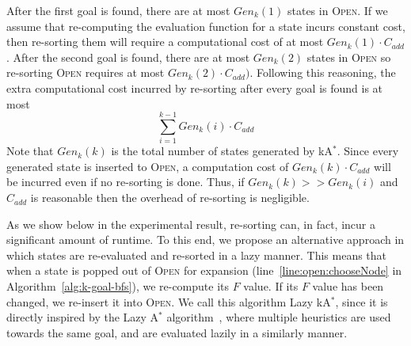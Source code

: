 \documentclass{aicom2e}
\newcommand{\astar}{A$^*$}
\newcommand{\kastar}{kA$^*$}
\newcommand{\open}{\textsc{Open}}
\begin{document}

After the first goal is found, there are at most $Gen_k(1)$ states in \open{}. If we assume that re-computing the evaluation function for a state incurs constant cost, then re-sorting them will require a computational cost of at most $Gen_k(1)\cdot C_{add}$. After the second goal is found, there are at most $Gen_k(2)$ states in \open{} so re-sorting \open{} requires at most $Gen_k(2)\cdot C_{add})$. Following this reasoning, the extra computational cost incurred by re-sorting after every goal is found is at most  
\begin{equation}  
\sum_{i=1}^{k-1} Gen_k(i)\cdot C_{add}
\label{eq:re-sort-cost}
\end{equation}
Note that $Gen_k(k)$ is the total number of states generated by \kastar{}. 
Since every generated state is inserted to \open{}, a computation cost of $Gen_k(k)\cdot C_{add}$ will be incurred even if no re-sorting is done. 
Thus, if $Gen_k(k)>>Gen_k(i)$ and $C_{add}$ is reasonable then the overhead of re-sorting is negligible. 


As we show below in the experimental result, re-sorting can, in fact, incur a significant amount of runtime. To this end, we propose an alternative approach in which states are re-evaluated and re-sorted in a lazy manner. This means that when a state is popped out of \open{} for expansion (line~\ref{line:open:chooseNode} in Algorithm~\ref{alg:k-goal-bfs}), we re-compute its $F$ value. If its $F$ value has been changed, we re-insert it into \open{}. 
We call this algorithm Lazy \kastar{}, since it is directly inspired by the Lazy \astar{} algorithm~\cite{betzalel2015typeSystem,tolpin2013toward}, where multiple heuristics are used towards the same goal, and are evaluated lazily in a similarly manner.  
\end{document}
